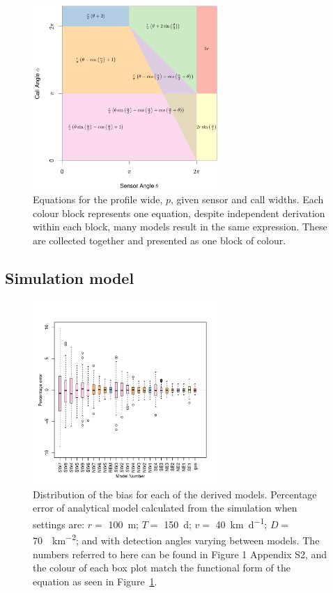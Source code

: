\documentclass[a4paper,10pt,reqno,oneside]{amsart}
\begin{document}
\begin{figure}
\centering
\includegraphics[width=7cm]{imgs/equalModelResults.pdf}
\caption{Equations for the profile wide, $p$, given sensor and call widths. Each colour block represents one equation, despite independent derivation within each block, many models result in the same expression. These are collected together and presented as one block of colour.}
\label{f:equalModelResults}
\end{figure}



\subsection{Simulation model}

\begin{figure}
	\centering
	\includegraphics[width=7cm]{imgs/AverageModelBias.pdf}
	\caption{Distribution of the bias for each of the derived models. Percentage error of analytical model calculated from the simulation when settings are: $r = $ \SI{100}{\meter}; $T = $ \SI{150}{\day}; $v = $ \SI{40}{\kilo\meter\per\day}; $D = $ \SI{70}{\animals\per\kilo\meter\squared}; and with detection angles varying between models. The numbers referred to here can be found in Figure 1 Appendix S2, and the colour of each box plot match the functional form of the equation as seen in Figure~\ref{f:equalModelResults}.
  }
	\label{f:ModelBias}
\end{figure}
\end{document}
